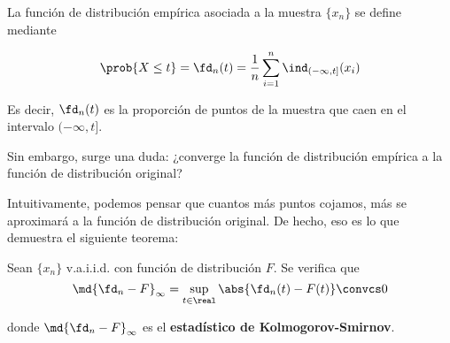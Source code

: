 \documentclass{apuntes}
\begin{document}
\begin{defn} La función de distribución empírica asociada a la muestra $\{x_n\}$ se define mediante

\[ \prob{X \leq t} =  \fd_n(t) = \frac{1}{n}\sum_{i=1}^n \ind_{(-\infty, t]} (x_i) \]

Es decir, $\fd_n(t)$ es la proporción de puntos de la muestra que caen en el intervalo $(-\infty, t]$.
\end{defn}

Sin embargo, surge una duda: ¿converge la función de distribución empírica a la función de distribución original?

Intuitivamente, podemos pensar que cuantos más puntos cojamos, más se aproximará a la función de distribución original. De hecho, eso es lo que demuestra el siguiente teorema:

\begin{theorem} Sean $\{x_n\}$ v.a.i.i.d. con función de distribución $F$. Se verifica que
\label{thmGlivenko}
\[ \md{\fd_n - F}_\infty=\sup_{t\in\real} \abs{\fd_n(t) - F(t)} \convcs 0 \]

donde $\md{\fd_n - F}_\infty$ es el \textbf{estadístico de Kolmogorov-Smirnov}.

\end{theorem}
\end{document}
